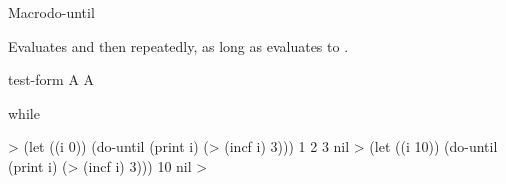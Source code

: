 \documentclass[10pt,twoside,english,pdftex]{article}
\begin{document}
\begin{functiondoc}{Macro}{do-until}{} 
%
  
\fnsyntax

\fnpurpose Evaluates  and then 
repeatedly, as long as  evaluates to \nil.

\fnpackage {}

\fnmodule {}

\fnargs
\begin{args}{test-form}
\arg[form] A 
 A 
\end{args}

\begin{alsos}{while}
\also[until]
\also[while]
\end{alsos}

\fnexamples
%
\W\supp
\begin{example}
  > (let ((i 0)) 
      (do-until (print i)
          (> (incf i) 3)))
  1 
  2 
  3 
  nil\goodpagebreak
  > (let ((i 10)) 
      (do-until (print i)
          (> (incf i) 3)))
  10
  nil
  >
\end{example}

\end{functiondoc}

\end{document}
